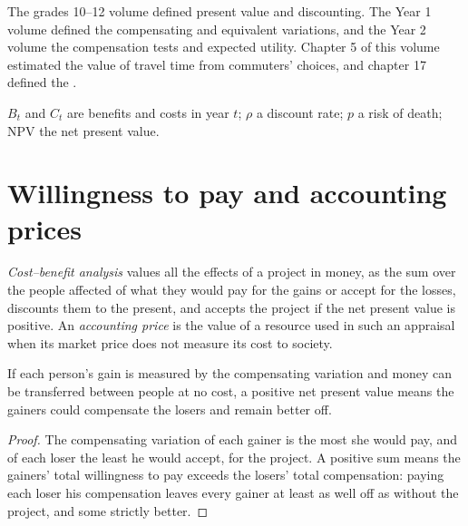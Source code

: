 \begin{recall}
The grades 10--12 volume defined present value and discounting. The Year 1 volume
defined the compensating and equivalent variations, and the Year 2 volume the
compensation tests and expected utility. Chapter 5 of this volume estimated the
value of travel time from commuters' choices, and chapter 17 defined the .
\end{recall}

\begin{notation}\label{not:b3:cost-benefit-analysis:symbols}
$B_t$ and $C_t$ are benefits and costs in year $t$; $\rho$ a discount rate; $p$ a risk of death;
$\mathrm{NPV}$ the net present value.
\end{notation}

\section{Willingness to pay and accounting prices}\label{sec:b3:cost-benefit-analysis:wtp}

\begin{definition}\label{def:b3:cost-benefit-analysis:cba}
\emph{Cost--benefit analysis} values all the effects of a project in money, as the
sum over the people affected of what they would pay for the gains or accept for the
losses, discounts them to the present, and accepts the project if the net present
value is positive. An \emph{accounting price} is the value of a resource used in such an
appraisal when its market price does not measure its cost to society.
\end{definition}

\begin{proposition}\label{prop:b3:cost-benefit-analysis:kaldor}
If each person's gain is measured by the compensating variation and money can be
transferred between people at no cost, a positive net present value means the
gainers could compensate the losers and remain better off.
\end{proposition}

\begin{proof}
The compensating variation of each gainer is the most she would pay, and of each
loser the least he would accept, for the project. A positive sum means the gainers'
total willingness to pay exceeds the losers' total compensation: paying each loser
his compensation leaves every gainer at least as well off as without the project,
and some strictly better.
\end{proof}

